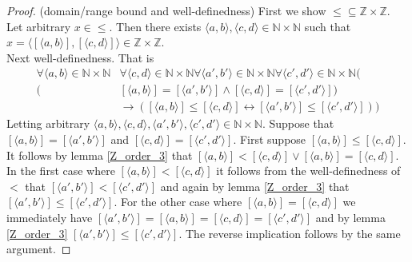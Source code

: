 \documentclass{report}
\begin{document}
\begin{proof}(domain/range bound and well-definedness)
First we show $\leq\subseteq\mathbb Z\times\mathbb Z$. Let arbitrary $x\in\leq$.
Then there exists $\langle a,b\rangle,\langle c,d\rangle\in\mathbb N\times\mathbb N$ such that
$x=\langle[\langle a,b\rangle],[\langle c,d\rangle]\rangle\in\mathbb Z\times\mathbb Z$.\\
\indent Next well-definedness. That is
\begin{align*}
\forall\langle a,b\rangle\in\mathbb N\times\mathbb N&\forall\langle c,d\rangle\in\mathbb N\times\mathbb N\forall\langle a',b'\rangle\in\mathbb N\times\mathbb N
\forall\langle c',d'\rangle\in\mathbb N\times\mathbb N(\\(&[\langle a,b\rangle]=[\langle a',b'\rangle]\land[\langle c,d\rangle]=
[\langle c',d'\rangle])\\
&\to([\langle a,b\rangle]\leq[\langle c,d\rangle]\leftrightarrow[\langle a',b'\rangle]\leq[\langle c',d'\rangle]))
\end{align*}
Letting arbitrary $\langle a,b\rangle,\langle c,d\rangle,\langle a',b'\rangle,\langle c',d'\rangle\in\mathbb N\times\mathbb N$. Suppose that 
$[\langle a,b\rangle]=[\langle a',b'\rangle]$ and $[\langle c,d\rangle]=[\langle c',d'\rangle]$. 
First suppose $[\langle a,b\rangle]\leq[\langle c,d\rangle]$. It follows by lemma \ref{Z_order_3}
that $[\langle a,b\rangle]<[\langle c,d\rangle]\lor[\langle a,b\rangle]=[\langle c,d\rangle]$.
In the first case where $[\langle a,b\rangle]<[\langle c,d\rangle]$ it follows from
the well-definedness of $<$ that $[\langle a',b'\rangle]<[\langle c',d'\rangle]$ and again by lemma \ref{Z_order_3} that $[\langle a',b'\rangle]\leq[\langle c',d'\rangle]$. For the other case where
$[\langle a,b\rangle]=[\langle c,d\rangle]$ we immediately have $[\langle a',b'\rangle]=[\langle a,b\rangle]=[\langle c,d\rangle]=[\langle c',d'\rangle]$ and by lemma \ref{Z_order_3} 
$[\langle a',b'\rangle]\leq[\langle c',d'\rangle]$. The reverse implication follows by the same argument.
\end{proof}
\newpage
\end{document}
